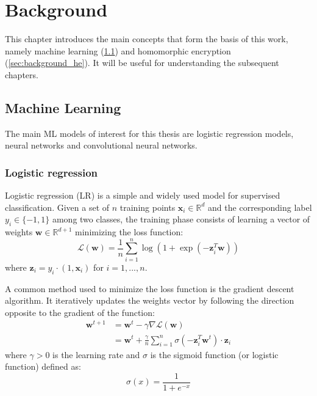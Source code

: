 \documentclass[a4paper,11pt,oneside]{report}
\begin{document}
\chapter{Background}\label{chap:background}



This chapter introduces the main concepts that form the basis of this work, namely machine learning (\ref{sec:background_ml}) and homomorphic encryption (\ref{sec:background_he}).
It will be useful for understanding the subsequent chapters.

\section{Machine Learning}\label{sec:background_ml}

The main ML models of interest for this thesis are logistic regression models, neural networks and convolutional neural networks.

\subsection{Logistic regression}

Logistic regression (LR) is a simple and widely used model for supervised classification. 
Given a set of $n$ training points $\mathbf{x}_i \in \mathbb{R}^d$ and the corresponding label $y_i \in \{-1,1\}$ among two classes, the training phase consists of learning a vector of weights $\mathbf{w} \in \mathbb{R}^{d+1}$ minimizing the loss function:
\begin{equation}\label{eq:logistic_reg_train}
    \mathcal{L}(\mathbf{w}) = \frac{1}{n} \sum_{i=1}^{n} \log(1 + \exp(-\mathbf{z}_i^T \mathbf{w})) 
\end{equation}
where $\mathbf{z}_i = y_i \cdot (1, \mathbf{x}_i)$ for $i=1,...,n$.

A common method used to minimize the loss function is the gradient descent algorithm. 
It iteratively updates the weights vector by following the direction opposite to the gradient of the function:
\begin{align}\label{eq:gradient_descent}
    \mathbf{w}^{t+1} & = \mathbf{w}^t - \gamma\nabla\mathcal{L}(\mathbf{w}) \nonumber \\ 
    & = \mathbf{w}^t + \frac{\gamma}{n} \sum_{i=1}^{n} \sigma(-\mathbf{z}_i^T \mathbf{w}^t) \cdot \mathbf{z}_i
\end{align}
where $\gamma > 0$ is the learning rate and $\sigma$ is the sigmoid function (or logistic function) defined as:
\begin{equation}\label{eq:sigmoid}
    \sigma(x) = \frac{1}{1 + e^{-x}}
\end{equation}
\end{document}

